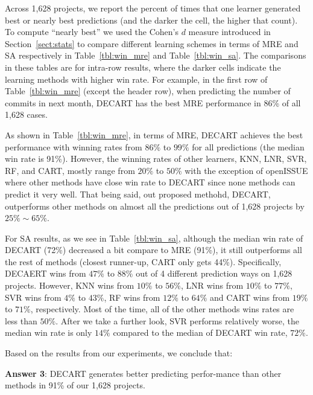 \documentclass[sigconf,review,anonymous]{acmart}
\newcommand{\tbl}[1]{Table~\ref{tbl:#1}}
\begin{document}
Across 1,628 projects, we report the percent of times that one learner generated best or nearly best predictions (and the darker the cell, the higher that count).  To compute ``nearly best'' we used the Cohen's $d$ measure introduced in Section~\ref{sect:stats} to compare different learning schemes in terms of MRE and SA respectively in \tbl{win_mre} and \tbl{win_sa}.  
 The comparisons in these tables are for intra-row results, where the darker cells indicate the learning methods with higher win rate. For example, in the first row of \tbl{win_mre} (except the header row), when predicting the number of commits in next month, DECART has the best MRE performance in 86\% of all 1,628 cases. 

As shown in \tbl{win_mre}, in terms of MRE, DECART achieves the best performance with winning rates from $86\%$ to $99\%$ for all predictions (the median win rate is 91\%). However, the winning rates of other learners, KNN, LNR, SVR, RF, and CART, mostly range from $20\%$ to $50\%$ with the exception of openISSUE where other methods have close win rate to DECART since none methods can predict it very well. That being said, out proposed methohd, DECART, outperforms other methods on almost all the predictions out of 1,628 projects by $25\% \sim 65\%$.


For SA results, as we see in \tbl{win_sa}, although the median win rate of DECART (72\%) decreased a bit compare to MRE (91\%), it still outperforms all the rest of methods (closest runner-up, CART only gets 44\%). Specifically, DECAERT wins from $47\%$ to $88\%$ out of 4 different prediction ways on 1,628 projects. However, KNN wins from $10\%$ to $56\%$, LNR wins from $10\%$ to $77\%$, SVR wins from $4\%$ to $43\%$, RF wins from $12\%$ to $64\%$ and CART wins from $19\%$ to $71\%$, respectively. Most of the time, all of the other methods wins rates are less than $50\%$. After we take a further look, SVR performs relatively worse, the median win rate is only $14\%$ compared to the median of DECART win rate, $72\%$. 




Based on the results from our experiments, we conclude that:
 

\begin{blockquote}
\noindent
\textbf{Answer 3}: 
DECART generates better predicting perfor-mance than other methods in 91\% of our 1,628 projects.
\end{blockquote}
\end{document}
